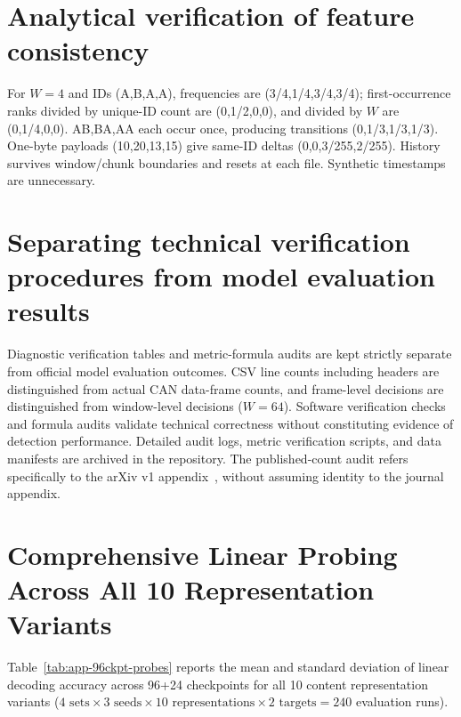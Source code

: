 \documentclass[12pt, a4paper, reqno, oneside]{book}
\begin{document}
\section{Analytical verification of feature consistency}
For $W=4$ and IDs (A,B,A,A), frequencies are (3/4,1/4,3/4,3/4); first-occurrence ranks divided by unique-ID count are (0,1/2,0,0), and divided by $W$ are (0,1/4,0,0). AB,BA,AA each occur once, producing transitions (0,1/3,1/3,1/3). One-byte payloads (10,20,13,15) give same-ID deltas (0,0,3/255,2/255). History survives window/chunk boundaries and resets at each file. Synthetic timestamps are unnecessary.

\section{Separating technical verification procedures from model evaluation results}
Diagnostic verification tables and metric-formula audits are kept strictly separate from official model evaluation outcomes. CSV line counts including headers are distinguished from actual CAN data-frame counts, and frame-level decisions are distinguished from window-level decisions ($W=64$). Software verification checks and formula audits validate technical correctness without constituting evidence of detection performance. Detailed audit logs, metric verification scripts, and data manifests are archived in the repository. The published-count audit refers specifically to the arXiv v1 appendix~\cite{lampe2023appendix}, without assuming identity to the journal appendix.

\section{Comprehensive Linear Probing Across All 10 Representation Variants}\label{sec:app-96ckpt-probes}
Table~\ref{tab:app-96ckpt-probes} reports the mean and standard deviation of linear decoding accuracy across 96+24 checkpoints for all 10 content representation variants ($4\text{ sets} \times 3\text{ seeds} \times 10\text{ representations} \times 2\text{ targets} = 240$ evaluation runs).
\end{document}
